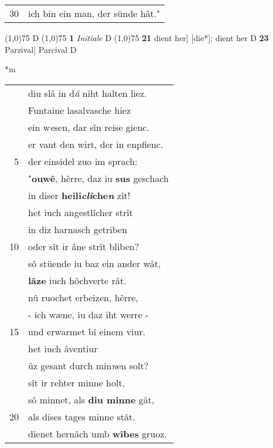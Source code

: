 \documentclass[8pt,a4paper,notitlepage]{article}
\begin{document}
\begin{table}[ht]
\begin{minipage}[t]{0.5\linewidth}
\begin{tabular}{rl}
30 & ich bin ein man, der sünde hât."\\ 
\end{tabular}
\scriptsize
\line(1,0){75} \newline
D \newline
\line(1,0){75} \newline
\textbf{1} \textit{Initiale} D  \newline
\line(1,0){75} \newline
\textbf{21} dient her] [die*]: dient her D \textbf{23} Parzival] Parcival D \newline
\end{minipage}
\hspace{0.5cm}
\begin{minipage}[t]{0.5\linewidth}
\small
\begin{center}*m
\end{center}
\begin{tabular}{rl}
 & diu slâ in d\textit{â} niht halten liez.\\ 
 & Funtaine lasalvasche hiez\\ 
 & ein w\textit{e}sen, dar sîn reise gienc.\\ 
 & er vant den wirt, der in enpfienc.\\ 
5 & der einsidel zuo im sprach:\\ 
 & "\textbf{ouwê}, hêrre, daz iu \textbf{sus} geschach\\ 
 & in diser \textbf{heili\textit{clî}che\textit{n}} zît!\\ 
 & het iuch angestlîcher strît\\ 
 & in diz harnasch getriben\\ 
10 & oder sît ir âne strît bliben?\\ 
 & sô stüende iu baz ein ander wât,\\ 
 & \textbf{lâze} iuch hôchverte rât.\\ 
 & nû ruochet erbeizen, hêrre,\\ 
 & - ich wæne, iu daz iht werre -\\ 
15 & und erwarmet bî einem viur.\\ 
 & het iuch âventiur\\ 
 & ûz gesant durch min\textit{n}en solt?\\ 
 & sît ir rehter minne holt,\\ 
 & sô minnet, als \textbf{diu minne} gât,\\ 
20 & als dises tages minne stât.\\ 
 & dienet hernâch umb \textbf{wîbes} gruoz.\\ 

\end{tabular}
\end{minipage}
\end{table}
\end{document}
